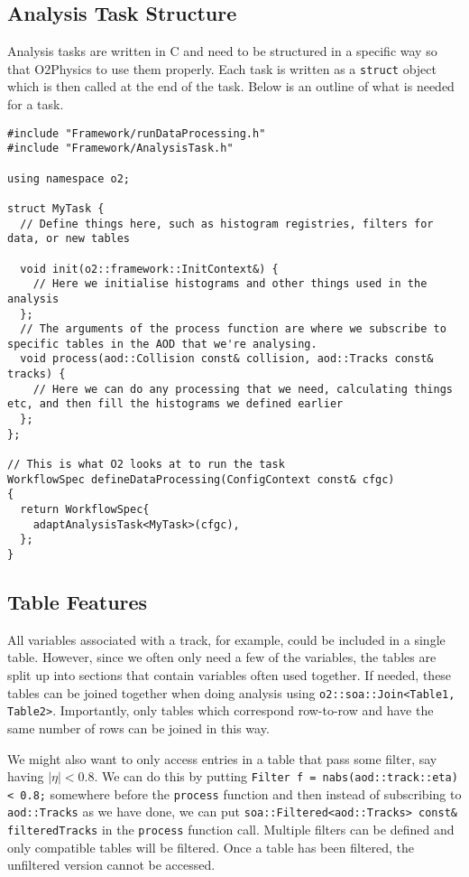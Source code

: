 \subsection{Analysis Task Structure}\label{sec:TaskStructure}
Analysis tasks are written in C\OldTexttt{++} and need to be structured in a specific way so that O2Physics to use them properly. Each task is written as a \texttt{struct} object which is then called at the end of the task. Below is an outline of what is needed for a task.

\begin{verbatim}
#include "Framework/runDataProcessing.h"
#include "Framework/AnalysisTask.h"

using namespace o2;

struct MyTask {
  // Define things here, such as histogram registries, filters for data, or new tables

  void init(o2::framework::InitContext&) {
    // Here we initialise histograms and other things used in the analysis
  };
  // The arguments of the process function are where we subscribe to specific tables in the AOD that we're analysing. 
  void process(aod::Collision const& collision, aod::Tracks const& tracks) {
    // Here we can do any processing that we need, calculating things etc, and then fill the histograms we defined earlier
  };
};

// This is what O2 looks at to run the task
WorkflowSpec defineDataProcessing(ConfigContext const& cfgc)
{
  return WorkflowSpec{
    adaptAnalysisTask<MyTask>(cfgc),
  };
}
\end{verbatim}

\subsection{Table Features}
All variables associated with a track, for example, could be included in a single table. However, since we often only need a few of the variables, the tables are split up into sections that contain variables often used together. If needed, these tables can be joined together when doing analysis using \texttt{o2::soa::Join<Table1, Table2>}. Importantly, only tables which correspond row-to-row and have the same number of rows can be joined in this way.

We might also want to only access entries in a table that pass some filter, say having $|\eta| < 0.8$. We can do this by putting \texttt{Filter f = nabs(aod::track::eta) < 0.8;} somewhere before the \texttt{process} function and then instead of subscribing to \texttt{aod::Tracks} as we have done, we can put \texttt{soa::Filtered<aod::Tracks> const\& filteredTracks} in the \texttt{process} function call. Multiple filters can be defined and only compatible tables will be filtered. Once a table has been filtered, the unfiltered version cannot be accessed. 

